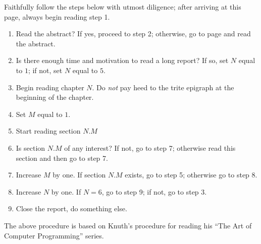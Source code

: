 \begin{preface}
  Faithfully follow the steps below with utmost diligence; after
  arriving at this page, always begin reading step 1.

 \begin{enumerate}
 \item Read the abstract? If yes, proceed to step 2; otherwise, go to
   page \pageref{combox-abstract} and read the abstract.
 \item Is there enough time and motivation to read a long report? If
   so, set $N$ equal to $1$; if not, set $N$ equal to $5$.
 \item Begin reading chapter $N$. Do \emph{not} pay heed to the trite
   epigraph at the beginning of the chapter.
 \item Set $M$ equal to $1$.
 \item Start reading section $N.M$
 \item Is section $N.M$ of any interest? If not, go to step 7;
   otherwise read this section and then go to step 7.
 \item Increase $M$ by one. If section $N.M$ exists, go to step 5;
   otherwise go to step 8.
 \item Increase $N$ by one. If $N = 6$, go to step 9; if not, go to
   step 3.
\item Close the report, do something else.
 \end{enumerate}

 The above procedure is based on Knuth's procedure for reading his
 ``The Art of Computer Programming'' series\cite{knuth}.
\end{preface}
